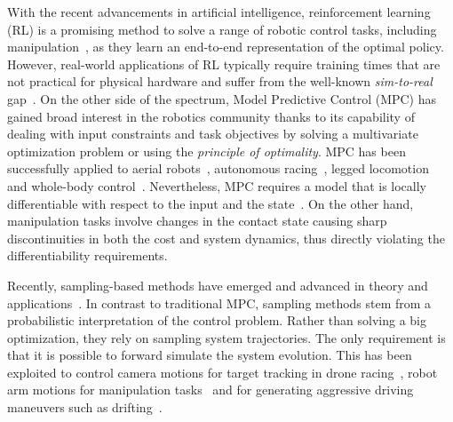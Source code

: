 With the recent advancements in artificial intelligence, reinforcement learning (RL) is a promising method to solve a range of robotic control tasks, including manipulation~\cite{finn2016deep}, as they learn an end-to-end representation of the optimal policy. However, real-world applications of RL typically require training times that are not practical for physical hardware and suffer from the well-known \emph{sim-to-real} gap~\cite{chebotar2019closing}. 
On the other side of the spectrum, Model Predictive Control (MPC) has gained broad interest in the robotics community thanks to its capability of dealing with input constraints and task objectives by solving a multivariate optimization problem or using the \emph{principle of optimality}. 
MPC has been successfully applied to aerial robots~\cite{brunner2020trajectory}, autonomous racing~\cite{liniger2015optimization}, legged locomotion~\cite{grandia2019frequency} and whole-body control~\cite{minniti2019whole}. Nevertheless, MPC requires a model that is locally differentiable with respect to the input and the state~\cite{buchli2017optimal}. On the other hand, manipulation tasks involve changes in the contact state causing sharp discontinuities in both the cost and system dynamics, thus directly violating the differentiability requirements. 

Recently, sampling-based methods have emerged and advanced in theory and applications~\cite{lee_aggressive_2020,abraham_model-based_2020,rajamaki_augmenting_2017}. 
In contrast to traditional MPC, sampling methods stem from a probabilistic interpretation of the control problem. 
Rather than solving a big optimization, they rely on sampling system trajectories. The only requirement is that it is possible to forward simulate the system evolution. This has been exploited to control camera motions for target tracking in drone racing~\cite{lee_aggressive_2020}, robot arm motions for manipulation tasks~\cite{abraham_model-based_2020} and for generating aggressive driving maneuvers such as drifting~\cite{williams_information_2017}. 

